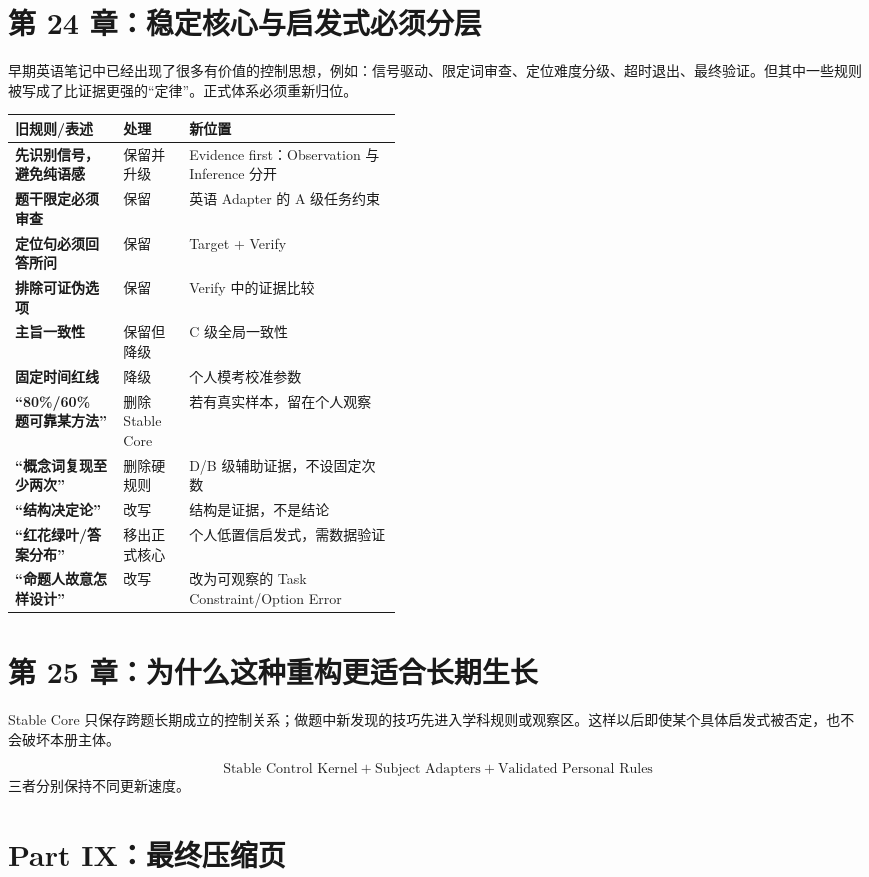 \documentclass[11pt,a4paper]{ctexart}
\begin{document}
\section{第 24 章：稳定核心与启发式必须分层}
早期英语笔记中已经出现了很多有价值的控制思想，例如：信号驱动、限定词审查、定位难度分级、超时退出、最终验证。但其中一些规则被写成了比证据更强的“定律”。正式体系必须重新归位。

\begin{center}
\small
\begin{tabularx}{\linewidth}{>{\bfseries}p{0.28\linewidth} p{0.17\linewidth} X}
\toprule
旧规则/表述 & 处理 & 新位置 \\
\midrule
先识别信号，避免纯语感 & 保留并升级 & Evidence first：Observation 与 Inference 分开 \\
题干限定必须审查 & 保留 & 英语 Adapter 的 A 级任务约束 \\
定位句必须回答所问 & 保留 & Target + Verify \\
排除可证伪选项 & 保留 & Verify 中的证据比较 \\
主旨一致性 & 保留但降级 & C 级全局一致性 \\
固定时间红线 & 降级 & 个人模考校准参数 \\
“80\%/60\% 题可靠某方法” & 删除 Stable Core & 若有真实样本，留在个人观察 \\
“概念词复现至少两次” & 删除硬规则 & D/B 级辅助证据，不设固定次数 \\
“结构决定论” & 改写 & 结构是证据，不是结论 \\
“红花绿叶/答案分布” & 移出正式核心 & 个人低置信启发式，需数据验证 \\
“命题人故意怎样设计” & 改写 & 改为可观察的 Task Constraint/Option Error \\
\bottomrule
\end{tabularx}
\end{center}

\section{第 25 章：为什么这种重构更适合长期生长}
Stable Core 只保存跨题长期成立的控制关系；做题中新发现的技巧先进入学科规则或观察区。这样以后即使某个具体启发式被否定，也不会破坏本册主体。

\[
\boxed{
\text{Stable Control Kernel}
+
\text{Subject Adapters}
+
\text{Validated Personal Rules}
}
\]
三者分别保持不同更新速度。

\newpage
\section{Part IX：最终压缩页}
\end{document}
